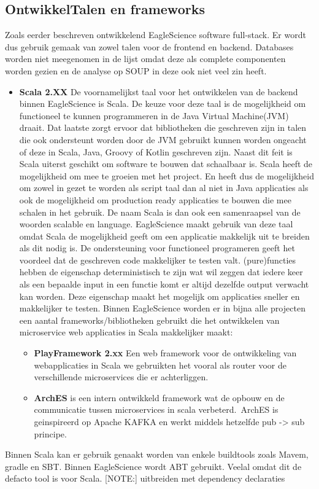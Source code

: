 \subsection{OntwikkelTalen en frameworks}\label{subsec:ontwikkeltalen-en-frameworks}
Zoals eerder beschreven ontwikkelend EagleScience software full-stack. Er wordt dus gebruik gemaak van zowel talen voor de frontend en backend. Databases worden niet meegenomen in de lijst omdat deze als complete componenten worden gezien en de analyse op SOUP in deze ook niet veel zin heeft.
\begin{itemize}
    \item \textbf{Scala 2.XX} De voornamelijkst taal voor het ontwikkelen van de backend binnen EagleScience is Scala. De keuze voor deze taal is de mogelijkheid om functioneel te kunnen programmeren in de Java Virtual Machine(JVM) draait. Dat laatste zorgt ervoor dat bibliotheken die geschreven zijn in talen die ook ondersteunt worden door de JVM gebruikt kunnen worden ongeacht of deze in Scala, Java, Groovy of Kotlin geschreven zijn. Naast dit feit is Scala uiterst geschikt om software te bouwen dat schaalbaar is. Scala heeft de mogelijkheid om mee te groeien met het project. En heeft dus de mogelijkheid om zowel in gezet te worden als script taal dan al niet in Java applicaties als ook de mogelijkheid om production ready applicaties te bouwen die mee schalen in het gebruik. De naam Scala is dan ook een samenraapsel van de woorden scalable en language.
    EagleScience maakt gebruik van deze taal omdat Scala de mogelijkheid geeft om een applicatie makkelijk uit te breiden als dit nodig is. De ondersteuning voor functioneel programeren geeft het voordeel dat de geschreven code makkelijker te testen valt. (pure)functies hebben de eigenschap deterministisch te zijn wat wil zeggen dat iedere keer als een bepaalde input in een functie komt er altijd dezelfde output verwacht kan worden. Deze eigenschap maakt het mogelijk om applicaties sneller en makkelijker te testen. Binnen EagleScience worden er in bijna alle projecten een aantal frameworks/bibliotheken gebruikt die het ontwikkelen van microservice web applicaties in Scala makkelijker maakt:
    \begin{itemize}
        \item \textbf{PlayFramework 2.xx} Een web framework voor de ontwikkeling van webapplicaties in Scala we gebruikten het vooral als router voor de verschillende microservices die er achterliggen.
        \item \textbf{ArchES} is een intern ontwikkeld framework wat de opbouw en de communicatie tussen microservices in scala verbeterd.\ ArchES is geinspireerd op Apache KAFKA en werkt middels hetzelfde pub -> sub principe.
    \end{itemize}
\end{itemize}
Binnen Scala kan er gebruik genaakt worden van enkele buildtools zoals Mavem, gradle en SBT. Binnen EagleScience wordt ABT gebruikt. Veelal omdat dit de defacto tool is voor Scala.
[NOTE:] uitbreiden met dependency declaraties
